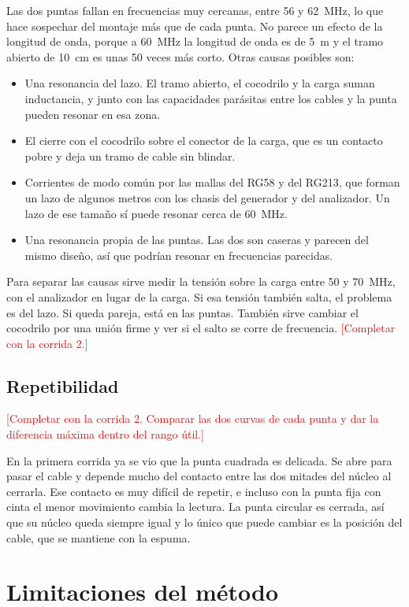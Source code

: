 \documentclass[11pt,a4paper]{article}
\newcommand{\pendiente}[1]{\textcolor{red}{[#1]}}
\begin{document}
Las dos puntas fallan en frecuencias muy cercanas, entre 56 y 62~MHz, lo que hace sospechar del montaje más que de cada punta. No parece un efecto de la longitud de onda, porque a 60~MHz la longitud de onda es de 5~m y el tramo abierto de 10~cm es unas 50 veces más corto. Otras causas posibles son:
\begin{itemize}
  \item Una resonancia del lazo. El tramo abierto, el cocodrilo y la carga suman inductancia, y junto con las capacidades parásitas entre los cables y la punta pueden resonar en esa zona.
  \item El cierre con el cocodrilo sobre el conector de la carga, que es un contacto pobre y deja un tramo de cable sin blindar.
  \item Corrientes de modo común por las mallas del RG58 y del RG213, que forman un lazo de algunos metros con los chasis del generador y del analizador. Un lazo de ese tamaño sí puede resonar cerca de 60~MHz.
  \item Una resonancia propia de las puntas. Las dos son caseras y parecen del mismo diseño, así que podrían resonar en frecuencias parecidas.
\end{itemize}
Para separar las causas sirve medir la tensión sobre la carga entre 50 y 70~MHz, con el analizador en lugar de la carga. Si esa tensión también salta, el problema es del lazo. Si queda pareja, está en las puntas. También sirve cambiar el cocodrilo por una unión firme y ver si el salto se corre de frecuencia. \pendiente{Completar con la corrida 2.}

\subsection{Repetibilidad}

\pendiente{Completar con la corrida 2. Comparar las dos curvas de cada punta y dar la diferencia máxima dentro del rango útil.}

En la primera corrida ya se vio que la punta cuadrada es delicada. Se abre para pasar el cable y depende mucho del contacto entre las dos mitades del núcleo al cerrarla. Ese contacto es muy difícil de repetir, e incluso con la punta fija con cinta el menor movimiento cambia la lectura. La punta circular es cerrada, así que su núcleo queda siempre igual y lo único que puede cambiar es la posición del cable, que se mantiene con la espuma.

\section{Limitaciones del método}
\end{document}
